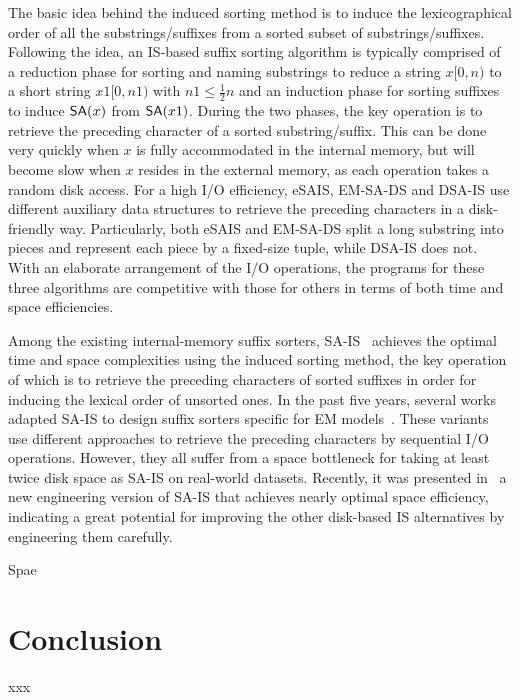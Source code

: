 \documentclass[10pt,journal,compsoc]{IEEEtran}
\begin{document}
The basic idea behind the induced sorting method is to induce the lexicographical order of all the substrings/suffixes from a sorted subset of substrings/suffixes. Following the idea, an IS-based suffix sorting algorithm is typically comprised of a reduction phase for sorting and naming substrings to reduce a string $x[0,n)$ to a short string $x1[0,n1)$ with $n1 \le \frac{1}{2}n$ and an induction phase for sorting suffixes to induce ${\sf SA}(x)$ from ${\sf SA}(x1)$. During the two phases, the key operation is to retrieve the preceding character of a sorted substring/suffix. This can be done very quickly when $x$ is fully accommodated in the internal memory, but will become slow when $x$ resides in the external memory, as each operation takes a random disk access. For a high I/O efficiency, eSAIS, EM-SA-DS and DSA-IS use different auxiliary data structures to retrieve the preceding characters in a disk-friendly way. Particularly, both eSAIS and EM-SA-DS split a long substring into pieces and represent each piece by a fixed-size tuple, while DSA-IS does not. With an elaborate arrangement of the I/O operations, the programs for these three algorithms are competitive with those for others in terms of both time and space efficiencies.


Among the existing internal-memory suffix sorters, SA-IS~\cite{Nong11} achieves the optimal time and space complexities using the induced sorting method, the key operation of which is to retrieve the preceding characters of sorted suffixes in order for inducing the lexical order of unsorted ones. In the past five years, several works adapted SA-IS to design suffix sorters specific for EM models~\cite{Nong14, Nong15, Karkkainen2014, Liu2015}. These variants use different approaches to retrieve the preceding characters by sequential I/O operations. However, they all suffer from a space bottleneck for taking at least twice disk space as SA-IS on real-world datasets. Recently, it was presented in~\cite{xxx} a new engineering version of SA-IS that achieves nearly optimal space efficiency, indicating a great potential for improving the other disk-based IS alternatives by engineering them carefully.


Spae


\section{Conclusion}
xxx





\end{document}
